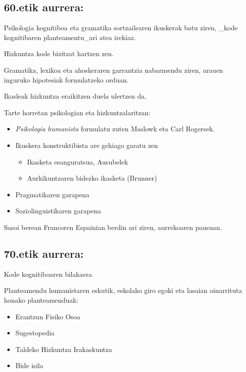 \documentclass[
]{book}
\providecommand{\tightlist}{%
  \setlength{\itemsep}{0pt}\setlength{\parskip}{0pt}}
\begin{document}
\hypertarget{etik-aurrera}{%
\subsection{60.etik aurrera:}\label{etik-aurrera}}

Psikologia kognitiboa eta gramatika sortzailearen ikuskerak batu ziren, \_kode kognitibaren planteamentu\_ari atea irekiaz.

Hizkuntza kode bizitzat hartzen zen.

Gramatika, lexikoa eta ahoskeraren garrantzia nabarmendu ziren, arauen inguruko hipotesiak formulatzeko orduan.

Ikasleak hizkuntza eraikitzen duela ulertzen da.

Tarte horretan psikologian eta hizkuntzalaritzan:

\begin{itemize}
\tightlist
\item
  \emph{Psikologia humanista} formulatu zuten Maslowk eta Carl Rogersek.
\item
  Ikuskera konstruktibista are gehiago garatu zen

  \begin{itemize}
  \tightlist
  \item
    Ikasketa esanguratsua, Ausubelek
  \item
    Aurkikuntzaren bidezko ikasketa (Brunner)
  \end{itemize}
\item
  Pragmatikaren garapena
\item
  Soziolinguistikaren garapena
\end{itemize}

Sasoi berean Francoren Espainian berdin ari ziren, aurrekoaren pausuan.

\hypertarget{etik-aurrera-1}{%
\subsection{70.etik aurrera:}\label{etik-aurrera-1}}

Kode kognitiboaren bilakaera

Planteamendu humanistaren eskutik, eskolako giro egoki eta lasaian oinarrituta honako planteamenduak:

\begin{itemize}
\tightlist
\item
  Erantzun Fisiko Osoa
\item
  Sugestopedia
\item
  Taldeko Hizkuntza Irakaskuntza
\item
  Bide isila
\end{itemize}
\end{document}
